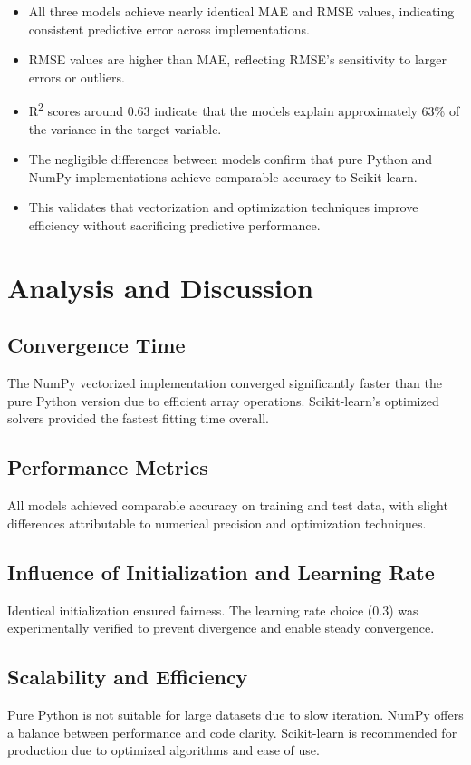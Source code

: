 \documentclass[a4paper,12pt]{article}
\begin{document}
\begin{itemize}
    \item All three models achieve nearly identical MAE and RMSE values, indicating consistent predictive error across implementations.
    \item RMSE values are higher than MAE, reflecting RMSE's sensitivity to larger errors or outliers.
    \item R\textsuperscript{2} scores around 0.63 indicate that the models explain approximately 63\% of the variance in the target variable.
    \item The negligible differences between models confirm that pure Python and NumPy implementations achieve comparable accuracy to Scikit-learn.
    \item This validates that vectorization and optimization techniques improve efficiency without sacrificing predictive performance.
\end{itemize}

\section{Analysis and Discussion}

\subsection{Convergence Time}
The NumPy vectorized implementation converged significantly faster than the pure Python version due to efficient array operations. Scikit-learn's optimized solvers provided the fastest fitting time overall.

\subsection{Performance Metrics}
All models achieved comparable accuracy on training and test data, with slight differences attributable to numerical precision and optimization techniques.

\subsection{Influence of Initialization and Learning Rate}
Identical initialization ensured fairness. The learning rate choice (0.3) was experimentally verified to prevent divergence and enable steady convergence.

\subsection{Scalability and Efficiency}
Pure Python is not suitable for large datasets due to slow iteration. NumPy offers a balance between performance and code clarity. Scikit-learn is recommended for production due to optimized algorithms and ease of use.
\end{document}

